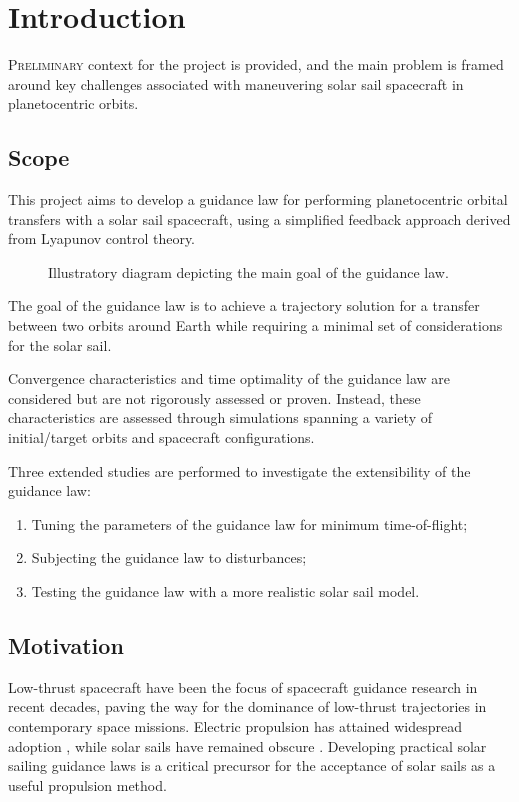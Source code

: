\chapter{Introduction}
\label{chp:introduction}

\lettrine{P}{reliminary} context for the project is provided, and the main problem is framed around key challenges associated with maneuvering solar sail spacecraft in planetocentric orbits.

\section{Scope}
This project aims to develop a guidance law for performing planetocentric orbital transfers with a solar sail spacecraft, using a simplified feedback approach derived from Lyapunov control theory.
\begin{figure}[H]
  \centering
  
  \caption{Illustratory diagram depicting the main goal of the guidance law.}
  \label{fig:intro_diagram}
\end{figure}
The goal of the guidance law is to achieve a trajectory solution for a transfer between two orbits around Earth while requiring a minimal set of considerations for the solar sail.

Convergence characteristics and time optimality of the guidance law are considered but are not rigorously assessed or proven. Instead, these characteristics are assessed through simulations spanning a variety of initial/target orbits and spacecraft configurations.

Three extended studies are performed to investigate the extensibility of the guidance law:
\begin{enumerate}
  \item Tuning the parameters of the guidance law for minimum time-of-flight;
  \item Subjecting the guidance law to disturbances;
  \item Testing the guidance law with a more realistic solar sail model.
\end{enumerate}

\section{Motivation}
Low-thrust spacecraft have been the focus of spacecraft guidance research in recent decades, paving the way for the dominance of low-thrust trajectories in contemporary space missions. Electric propulsion has attained widespread adoption \cite{lev2019technological, spencer2021lightsail}, while solar sails have remained obscure \cite{mori2010first}. Developing practical solar sailing guidance laws is a critical precursor for the acceptance of solar sails as a useful propulsion method.

